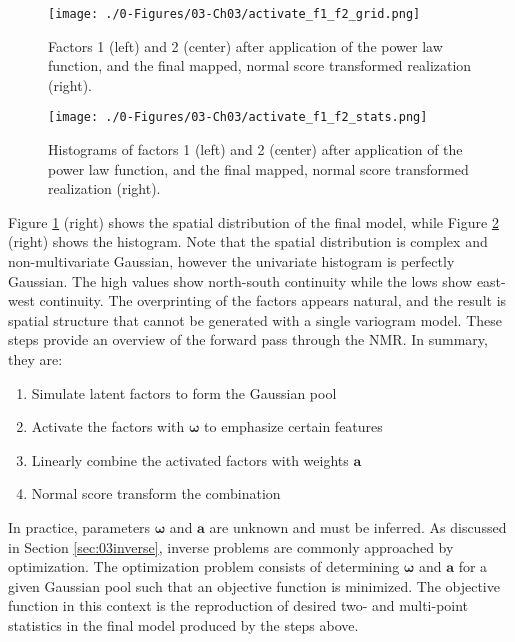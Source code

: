 \begin{figure}[htb!]
    \centering
    \texttt{[image: ./0-Figures/03-Ch03/activate\_f1\_f2\_grid.png]}
    \caption{Factors 1 (left) and 2 (center) after application of the power law function, and the final mapped, normal score transformed realization (right).}
    \label{fig:activate_f1_f2_grid}
\end{figure}

\begin{figure}[htb!]
    \centering
    \texttt{[image: ./0-Figures/03-Ch03/activate\_f1\_f2\_stats.png]}
    \caption{Histograms of factors 1 (left) and 2 (center) after application of the power law function, and the final mapped, normal score transformed realization (right).}
    \label{fig:activate_f1_f2_stats}
\end{figure}

Figure \ref{fig:activate_f1_f2_grid} (right) shows the spatial distribution of the final model, while Figure \ref{fig:activate_f1_f2_stats} (right) shows the histogram. Note that the spatial distribution is complex and non-multivariate Gaussian, however the univariate histogram is perfectly Gaussian. The high values show north-south continuity while the lows show east-west continuity. The overprinting of the factors appears natural, and the result is spatial structure that cannot be generated with a single variogram model. These steps provide an overview of the forward pass through the \gls{NMR}. In summary, they are:
\begin{enumerate}[noitemsep]
    \item Simulate latent factors to form the Gaussian pool
    \item Activate the factors with $\boldsymbol{\omega}$ to emphasize certain features
    \item Linearly combine the activated factors with weights $\mathbf{a}$
    \item Normal score transform the combination
\end{enumerate}

In practice, parameters $\boldsymbol{\omega}$ and $\mathbf{a}$ are unknown and must be inferred. As discussed in Section \ref{sec:03inverse}, inverse problems are commonly approached by optimization. The optimization problem consists of determining $\boldsymbol{\omega}$ and $\mathbf{a}$ for a given Gaussian pool such that an objective function is minimized. The objective function in this context is the reproduction of desired two- and multi-point statistics in the final model produced by the steps above.

